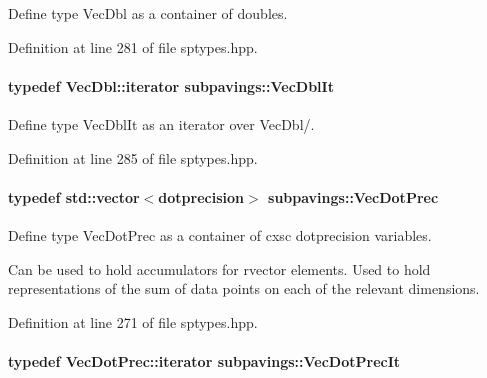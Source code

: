 \-Define type \-Vec\-Dbl as a container of doubles. 



\-Definition at line 281 of file sptypes.\-hpp.

\hypertarget{namespacesubpavings_a0b710d91e323ef0b7c2c811a535c5fab}{
\paragraph[{\-Vec\-Dbl\-It}]{\setlength{\rightskip}{0pt plus 5cm}typedef \-Vec\-Dbl\-::iterator {\bf subpavings\-::\-Vec\-Dbl\-It}}}\label{namespacesubpavings_a0b710d91e323ef0b7c2c811a535c5fab}


\-Define type \-Vec\-Dbl\-It as an iterator over \-Vec\-Dbl/. 



\-Definition at line 285 of file sptypes.\-hpp.

\hypertarget{namespacesubpavings_ad8f0a077ee1c4678bcd1868f3aecd605}{
\paragraph[{\-Vec\-Dot\-Prec}]{\setlength{\rightskip}{0pt plus 5cm}typedef std\-::vector$<$dotprecision$>$ {\bf subpavings\-::\-Vec\-Dot\-Prec}}}\label{namespacesubpavings_ad8f0a077ee1c4678bcd1868f3aecd605}


\-Define type \-Vec\-Dot\-Prec as a container of cxsc dotprecision variables. 

\-Can be used to hold accumulators for rvector elements. \-Used to hold representations of the sum of data points on each of the relevant dimensions. 

\-Definition at line 271 of file sptypes.\-hpp.

\hypertarget{namespacesubpavings_a80a828acc57552427c90b1f3119af173}{
\paragraph[{\-Vec\-Dot\-Prec\-It}]{\setlength{\rightskip}{0pt plus 5cm}typedef \-Vec\-Dot\-Prec\-::iterator {\bf subpavings\-::\-Vec\-Dot\-Prec\-It}}}\label{namespacesubpavings_a80a828acc57552427c90b1f3119af173}


